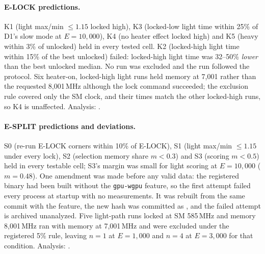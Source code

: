 \paragraph{E-LOCK predictions.} K1 (light max/min $\le 1.15$ locked high), K3 (locked-low light time within 25\% of D1's slow mode at $E=10{,}000$), K4 (no heater effect locked high) and K5 (heavy within 3\% of unlocked) held in every tested cell. K2 (locked-high light time within 15\% of the best unlocked) failed: locked-high light time was 32--50\% \emph{lower} than the best unlocked median. No run was excluded and the run followed the protocol. Six heater-on, locked-high light runs held memory at 7,001 rather than the requested 8,001\,MHz although the lock command succeeded; the exclusion rule covered only the SM clock, and their times match the other locked-high runs, so K4 is unaffected. Analysis: .

\paragraph{E-SPLIT predictions and deviations.} S0 (re-run E-LOCK corners within 10\% of E-LOCK), S1 (light max/min $\le 1.15$ under every lock), S2 (selection memory share $m<0.3$) and S3 (scoring $m<0.5$) held in every testable cell; S3's margin was small for light scoring at $E=10{,}000$ ($m=0.48$). One amendment was made before any valid data: the registered binary had been built without the \texttt{gpu-wgpu} feature, so the first attempt failed every process at startup with no measurements. It was rebuilt from the same commit with the feature, the new hash was committed as , and the failed attempt is archived unanalyzed. Five light-path runs locked at SM 585\,MHz and memory 8,001\,MHz ran with memory at 7,001\,MHz and were excluded under the registered 5\% rule, leaving $n=1$ at $E=1{,}000$ and $n=4$ at $E=3{,}000$ for that condition. Analysis: .

